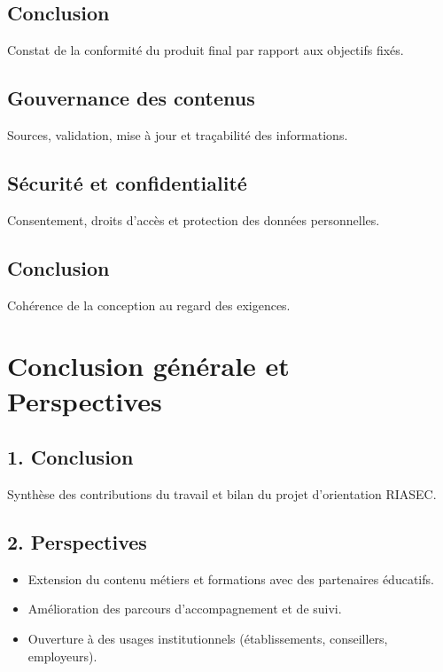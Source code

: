\documentclass[12pt,a4paper]{report}
\begin{document}
\section{Conclusion}
Constat de la conformité du produit final par rapport aux objectifs fixés.

\section{Gouvernance des contenus}
Sources, validation, mise à jour et traçabilité des informations.

\section{Sécurité et confidentialité}
Consentement, droits d’accès et protection des données personnelles.

\section{Conclusion}
Cohérence de la conception au regard des exigences.

\chapter*{Conclusion générale et Perspectives}

\section*{1. Conclusion}
Synthèse des contributions du travail et bilan du projet d’orientation RIASEC.

\section*{2. Perspectives}
\begin{itemize}
    \item Extension du contenu métiers et formations avec des partenaires éducatifs.
    \item Amélioration des parcours d’accompagnement et de suivi.
    \item Ouverture à des usages institutionnels (établissements, conseillers, employeurs).
\end{itemize}
\end{document}
